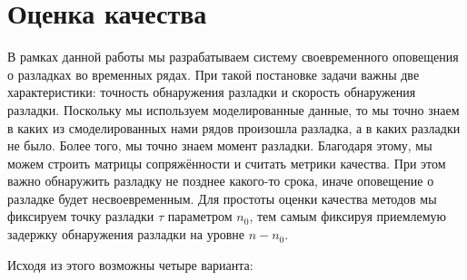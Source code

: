 \documentclass[%
12pt,
master,  %
natbib,      %
subf,        %
substylefile = spbu.rtx,
href,        %
colorlinks,  %
]{disser}
\begin{document}

\section{Оценка качества}

В рамках данной работы мы разрабатываем систему своевременного оповещения о разладках во временных рядах. При такой постановке задачи важны две характеристики: точность обнаружения разладки и скорость обнаружения разладки. Поскольку мы используем моделированные данные, то мы точно знаем в каких из смоделированных нами рядов произошла разладка, а в каких разладки не было. Более того, мы точно знаем момент разладки. Благодаря этому, мы можем строить матрицы сопряжённости и считать метрики качества. При этом важно обнаружить разладку не позднее какого-то срока, иначе оповещение о разладке будет несвоевременным. Для простоты оценки качества методов мы фиксируем точку разладки $\tau$ параметром $n_0$, тем самым фиксируя приемлемую задержку обнаружения разладки на уровне $n - n_0$.


Исходя из этого возможны четыре варианта:

\end{document}

